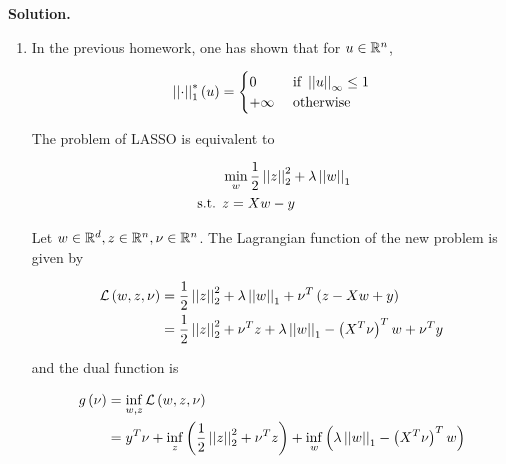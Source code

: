 \documentclass[a4paper, 11pt]{report}
\begin{document}
\textbf{Solution.}
\begin{enumerate}

    \item In the previous homework, one has shown that for $u \in \mathbb{R}^{n}$,
    
    \begin{equation*}
        \left|\left| \cdot \right|\right|_{1}^{*}(u) = \begin{cases}
        0 & \text{ if } \left|\left| u \right|\right|_{\infty} \leq 1 \\
        + \infty & \text{ otherwise }
        \end{cases}
    \end{equation*}
    
    The problem of LASSO is equivalent to

    \begin{equation}
        \begin{aligned}
        & \min_{w}
        \frac{1}{2} \left|\left| z \right|\right|_{2}^{2} + \lambda \left|\left| w \right|\right|_{1} \\
        \text{ s.t. }
        & z = Xw - y
        \end{aligned}
    \end{equation}
    
    Let $w \in \mathbb{R}^{d}, z \in \mathbb{R}^{n}, \nu \in \mathbb{R}^{n}$. The Lagrangian function of the new problem is given by
    
    \begin{equation*}
        \begin{aligned}
        \mathcal{L} \left( w, z, \nu \right) &= \frac{1}{2} \left|\left| z \right|\right|_{2}^{2} + \lambda \left|\left| w \right|\right|_{1} + \nu^{T} \left( z - Xw + y \right) \\
        &= \frac{1}{2} \left|\left| z \right|\right|_{2}^{2} + \nu^{T} z + \lambda \left|\left| w \right|\right|_{1} - \left( X^{T} \nu \right)^{T} w + \nu^{T} y
        \end{aligned}
    \end{equation*}
    
    and the dual function is
    
        \begin{equation*}
        \begin{aligned}
        g \left( \nu \right) &= \inf_{w, z} \mathcal{L} \left( w, z, \nu \right) \\
        &= y^{T} \nu + \inf_{z} \left( \frac{1}{2} \left|\left| z \right|\right|_{2}^{2} + \nu^{T} z \right) + \inf_{w} \left( \lambda \left|\left| w \right|\right|_{1} - \left( X^{T} \nu \right)^{T} w \right)
        \end{aligned}
    \end{equation*}
    

\end{enumerate}
\end{document}
